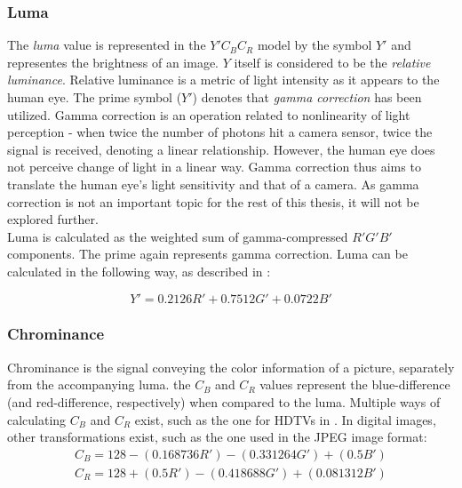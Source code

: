 \documentclass[thesis=M,english]{FITthesis}[2012/10/20]
\begin{document}
\subsubsection{Luma}
The \emph{luma} value is represented in the $Y'C_{B}C_{R}$ model by the symbol $Y'$
and representes the brightness of an image. $Y$ itself is considered to be the \emph{relative
luminance}. Relative luminance is a metric of light intensity as it appears to the human eye.
The prime symbol ($Y'$) denotes that \emph{gamma correction} has been utilized. Gamma correction
is an operation related to nonlinearity of light perception - when twice the number of
photons hit a camera sensor, twice the signal is received, denoting a linear relationship.
However, the human eye does not perceive change of light in a linear way. Gamma correction
thus aims to translate the human eye's light sensitivity and that of a camera. \cite{img:gamma}
As gamma correction is not an important topic for the rest of this thesis, it will not be
explored further.
\\

Luma is calculated as the weighted sum of gamma-compressed $R'G'B'$ components. The prime
again represents gamma correction. Luma can be calculated in the following way, as described in
\cite{img:rec-709}:

\begin{equation}
  \label{formula:luma}
  Y' = 0.2126R' + 0.7512G' + 0.0722B'
\end{equation}

\subsubsection{Chrominance}
Chrominance is the signal conveying the color information of a picture, separately
from the accompanying luma. the $C_{B}$ and $C_{R}$ values represent the blue-difference
(and red-difference, respectively) when compared to the luma.
Multiple ways of calculating $C_{B}$ and $C_{R}$ exist, such as the one for HDTVs in \cite{img:rec-709}.
In digital images, other transformations exist, such as the one used in the JPEG image format:
\begin{equation}
  \begin{aligned}
    C_B = 128 - (0.168736R') - (0.331264G') + (0.5B')\\
    C_R = 128 + (0.5R') - (0.418688G') + (0.081312B')
  \end{aligned}
\end{equation}
\cite{jfif}
\end{document}
